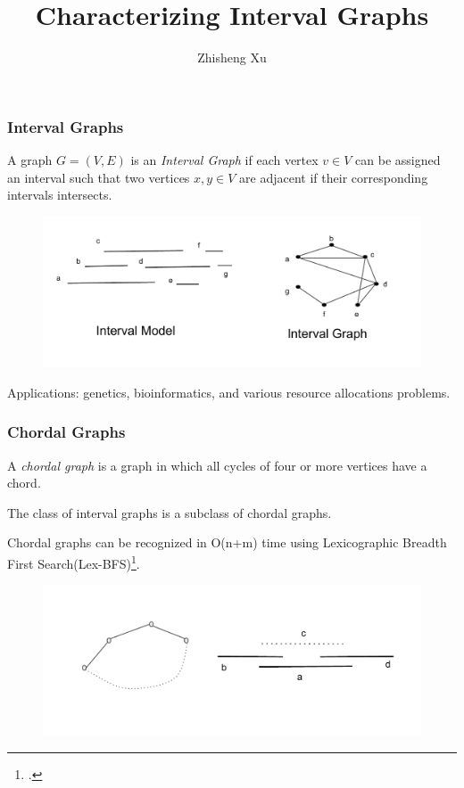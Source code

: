 \documentclass{beamer}
\title{Characterizing Interval Graphs}
\author{Zhisheng Xu}
\date{Committee Members:

Dr. Ross McConnell (Advisor)

Dr. Anton Bohm

Dr. Hamid Chitsaz
}
\begin{document}
\maketitle
\begin{frame}
	\frametitle{Interval Graphs}

A graph $G = (V,E)$ is an \emph{Interval Graph} if each vertex $v \in V$ can be assigned an interval such that two vertices $x,y \in V$ are adjacent if their corresponding intervals intersects.

	\begin{figure}
		\includegraphics[width = 1.0\textwidth]{figures/interval_graph.pdf}
	\end{figure}
Applications: genetics, bioinformatics, and various resource allocations problems.
\end{frame}

\begin{frame}
	\frametitle{Chordal Graphs}
		A \emph{chordal graph} is a graph in which all cycles of four or more vertices have a chord.
		
		\vspace{0.1in}
		
		The class of interval graphs is a subclass of chordal graphs.
		
		\vspace{0.1in}
		
		Chordal graphs can be recognized in O(n+m) time using Lexicographic Breadth First Search(Lex-BFS)\footcite{rose1976algorithmic}.
		
	\begin{figure}
		\includegraphics[width = 1\textwidth]{figures/chordal_graph.pdf}
	\end{figure}

	
\end{frame}
\end{document}
